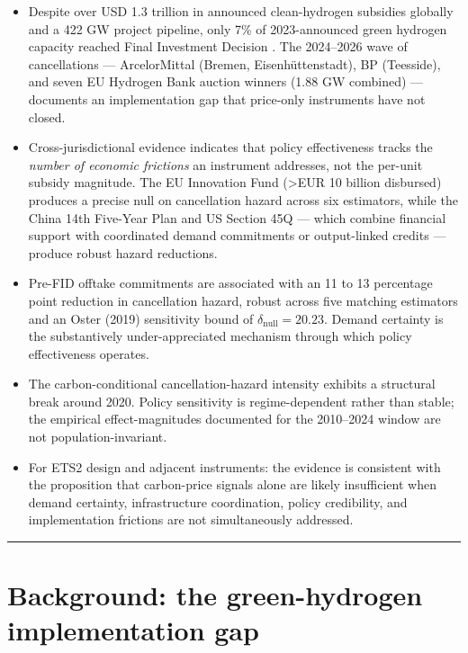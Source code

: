 \documentclass[11pt,a4paper]{article}
\begin{document}
\begin{itemize}
\item Despite over USD 1.3 trillion in announced clean-hydrogen subsidies globally and a 422 GW project pipeline, only 7\% of 2023-announced green hydrogen capacity reached Final Investment Decision \cite{odenweller2025green}. The 2024--2026 wave of cancellations --- ArcelorMittal (Bremen, Eisenhüttenstadt), BP (Teesside), and seven EU Hydrogen Bank auction winners (1.88 GW combined) --- documents an implementation gap that price-only instruments have not closed.
\item Cross-jurisdictional evidence indicates that policy effectiveness tracks the \emph{number of economic frictions} an instrument addresses, not the per-unit subsidy magnitude. The EU Innovation Fund (>EUR 10 billion disbursed) produces a precise null on cancellation hazard across six estimators, while the China 14th Five-Year Plan and US Section 45Q --- which combine financial support with coordinated demand commitments or output-linked credits --- produce robust hazard reductions.
\item Pre-FID offtake commitments are associated with an 11 to 13 percentage point reduction in cancellation hazard, robust across five matching estimators and an Oster (2019) sensitivity bound of $\delta_{\text{null}} = 20.23$. Demand certainty is the substantively under-appreciated mechanism through which policy effectiveness operates.
\item The carbon-conditional cancellation-hazard intensity exhibits a structural break around 2020. Policy sensitivity is regime-dependent rather than stable; the empirical effect-magnitudes documented for the 2010--2024 window are not population-invariant.
\item For ETS2 design and adjacent instruments: the evidence is consistent with the proposition that carbon-price signals alone are likely insufficient when demand certainty, infrastructure coordination, policy credibility, and implementation frictions are not simultaneously addressed.
\end{itemize}
\vspace{0.2em}
\hrule
\medskip

\vspace{0.4em}

\section{Background: the green-hydrogen implementation gap}
\end{document}
